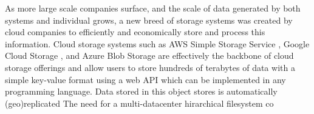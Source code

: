 As more large scale companies surface, and the scale of data generated by both systems and individual grows, a new breed of storage systems was created by cloud companies to efficiently and economically store and process this information.
Cloud storage systems such as AWS Simple Storage Service \cite{aws-s3}, Google Cloud Storage \cite{gcp-storage}, and Azure Blob Storage \cite{azure-blob} are effectively the backbone of cloud storage offerings and allow users to store hundreds of terabytes of data with a simple key-value format using a web API which can be implemented in any programming language.
Data stored in this object stores is automatically (geo)replicated 
The need for a multi-datacenter hirarchical filesystem co